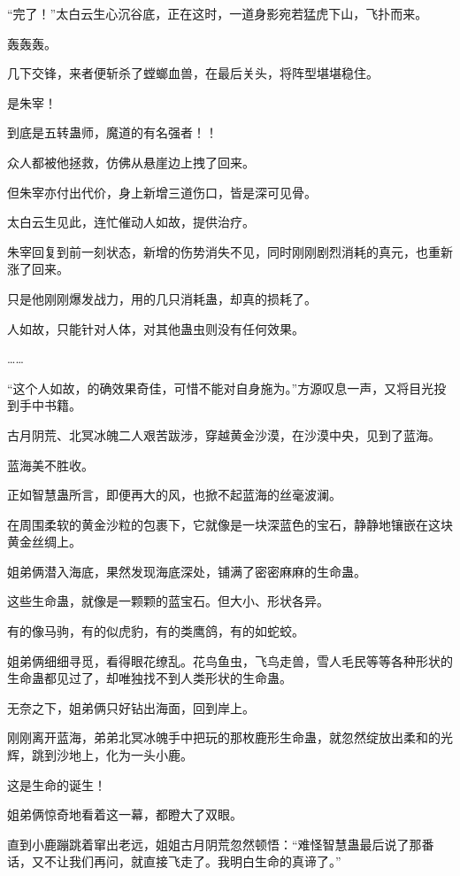 \begin{this_body}
“完了！”太白云生心沉谷底，正在这时，一道身影宛若猛虎下山，飞扑而来。

轰轰轰。

几下交锋，来者便斩杀了螳螂血兽，在最后关头，将阵型堪堪稳住。

是朱宰！

到底是五转蛊师，魔道的有名强者！！

众人都被他拯救，仿佛从悬崖边上拽了回来。

但朱宰亦付出代价，身上新增三道伤口，皆是深可见骨。

太白云生见此，连忙催动人如故，提供治疗。

朱宰回复到前一刻状态，新增的伤势消失不见，同时刚刚剧烈消耗的真元，也重新涨了回来。

只是他刚刚爆发战力，用的几只消耗蛊，却真的损耗了。

人如故，只能针对人体，对其他蛊虫则没有任何效果。

……

“这个人如故，的确效果奇佳，可惜不能对自身施为。”方源叹息一声，又将目光投到手中书籍。

古月阴荒、北冥冰魄二人艰苦跋涉，穿越黄金沙漠，在沙漠中央，见到了蓝海。

蓝海美不胜收。

正如智慧蛊所言，即便再大的风，也掀不起蓝海的丝毫波澜。

在周围柔软的黄金沙粒的包裹下，它就像是一块深蓝色的宝石，静静地镶嵌在这块黄金丝绸上。

姐弟俩潜入海底，果然发现海底深处，铺满了密密麻麻的生命蛊。

这些生命蛊，就像是一颗颗的蓝宝石。但大小、形状各异。

有的像马驹，有的似虎豹，有的类鹰鸽，有的如蛇蛟。

姐弟俩细细寻觅，看得眼花缭乱。花鸟鱼虫，飞鸟走兽，雪人毛民等等各种形状的生命蛊都见过了，却唯独找不到人类形状的生命蛊。

无奈之下，姐弟俩只好钻出海面，回到岸上。

刚刚离开蓝海，弟弟北冥冰魄手中把玩的那枚鹿形生命蛊，就忽然绽放出柔和的光辉，跳到沙地上，化为一头小鹿。

这是生命的诞生！

姐弟俩惊奇地看着这一幕，都瞪大了双眼。

直到小鹿蹦跳着窜出老远，姐姐古月阴荒忽然顿悟：“难怪智慧蛊最后说了那番话，又不让我们再问，就直接飞走了。我明白生命的真谛了。”


\end{this_body}
